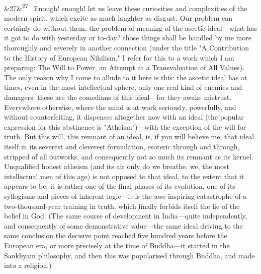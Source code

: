 \documentclass[12pt]{article}
\newcommand{\para}[1][]{\par\noindent\ifx&#1&\else\textsuperscript{\footnotesize #1}~\fi}
\begin{document}
\para[27] Enough! enough! let us leave these curiosities and complexities of the modern spirit, which excite as much laughter as disgust. Our problem can certainly do without them, the problem of meaning of the ascetic ideal---what has it got to do with yesterday or to-day? those things shall be handled by me more thoroughly and severely in another connection (under the title "A Contribution to the History of European Nihilism," I refer for this to a work which I am preparing: The Will to Power, an Attempt at a Transvaluation of All Values). The only reason why I come to allude to it here is this: the ascetic ideal has at times, even in the most intellectual sphere, only one real kind of enemies and damagers: these are the comedians of this ideal---for they awake mistrust. Everywhere otherwise, where the mind is at work seriously, powerfully, and without counterfeiting, it dispenses altogether now with an ideal (the popular expression for this abstinence is "Atheism")---with the exception of the will for truth. But this will, this remnant of an ideal, is, if you will believe me, that ideal itself in its severest and cleverest formulation, esoteric through and through, stripped of all outworks, and consequently not so much its remnant as its kernel. Unqualified honest atheism (and its air only do we breathe, we, the most intellectual men of this age) is not opposed to that ideal, to the extent that it appears to be; it is rather one of the final phases of its evolution, one of its syllogisms and pieces of inherent logic---it is the awe-inspiring catastrophe of a two-thousand-year training in truth, which finally forbids itself the lie of the belief in God. (The same course of development in India---quite independently, and consequently of some demonstrative value---the same ideal driving to the same conclusion the decisive point reached five hundred years before the European era, or more precisely at the time of Buddha---it started in the Sankhyam philosophy, and then this was popularised through Buddha, and made into a religion.)
\end{document}
